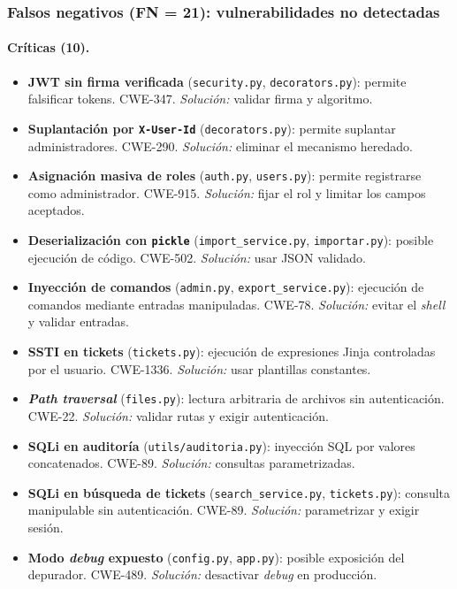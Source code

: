 \documentclass[11pt,letterpaper]{article}
\newcommand{\f}[1]{\texttt{#1}}
\begin{document}
\subsubsection{Falsos negativos (FN = 21): vulnerabilidades no detectadas}\label{sec:fn}

\paragraph{Críticas (10).}
\begin{itemize}
  \item \textbf{JWT sin firma verificada} (\f{security.py}, \f{decorators.py}): permite falsificar tokens. CWE-347. \textit{Solución:} validar firma y algoritmo.
  \item \textbf{Suplantación por \f{X-User-Id}} (\f{decorators.py}): permite suplantar administradores. CWE-290. \textit{Solución:} eliminar el mecanismo heredado.
  \item \textbf{Asignación masiva de roles} (\f{auth.py}, \f{users.py}): permite registrarse como administrador. CWE-915. \textit{Solución:} fijar el rol y limitar los campos aceptados.
  \item \textbf{Deserialización con \f{pickle}} (\f{import\_service.py}, \f{importar.py}): posible ejecución de código. CWE-502. \textit{Solución:} usar JSON validado.
  \item \textbf{Inyección de comandos} (\f{admin.py}, \f{export\_service.py}): ejecución de comandos mediante entradas manipuladas. CWE-78. \textit{Solución:} evitar el \textit{shell} y validar entradas.
  \item \textbf{SSTI en tickets} (\f{tickets.py}): ejecución de expresiones Jinja controladas por el usuario. CWE-1336. \textit{Solución:} usar plantillas constantes.
  \item \textbf{\textit{Path traversal}} (\f{files.py}): lectura arbitraria de archivos sin autenticación. CWE-22. \textit{Solución:} validar rutas y exigir autenticación.
  \item \textbf{SQLi en auditoría} (\f{utils/auditoria.py}): inyección SQL por valores concatenados. CWE-89. \textit{Solución:} consultas parametrizadas.
  \item \textbf{SQLi en búsqueda de tickets} (\f{search\_service.py}, \f{tickets.py}): consulta manipulable sin autenticación. CWE-89. \textit{Solución:} parametrizar y exigir sesión.
  \item \textbf{Modo \textit{debug} expuesto} (\f{config.py}, \f{app.py}): posible exposición del depurador. CWE-489. \textit{Solución:} desactivar \textit{debug} en producción.
\end{itemize}
\end{document}
